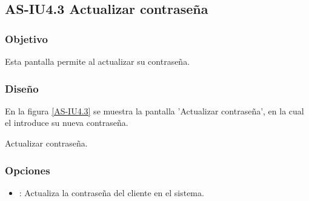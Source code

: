 %

\subsection{AS-IU4.3 Actualizar contraseña}

\subsubsection{Objetivo}
Esta pantalla permite al  actualizar su contraseña.

\subsubsection{Diseño}
En la figura \ref{AS-IU4.3} se muestra la pantalla 'Actualizar contraseña', en la cual el  introduce su nueva contraseña.


{Actualizar contraseña.} 

\subsubsection{Opciones}
\begin{itemize}
	\item {}: Actualiza la contraseña del cliente en el sistema.
\end{itemize}

